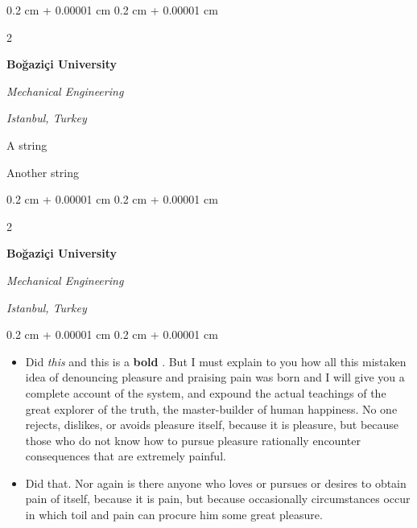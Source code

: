 \documentclass[10pt, letterpaper]{article}
\newenvironment{summary}{
    \begin{description}[
        topsep=0.10 cm,
        parsep=0.10 cm,
        partopsep=0pt,
        itemsep=0pt,
        leftmargin=0.4 cm + 10pt
    ]
}{
    \end{description}
} %
\newenvironment{highlights}{
    \begin{itemize}[
        topsep=0.10 cm,
        parsep=0.10 cm,
        partopsep=0pt,
        itemsep=0pt,
        leftmargin=0.4 cm + 10pt
    ]
}{
    \end{itemize}
} %
\newenvironment{onecolentry}{
    \begin{adjustwidth}{
        0.2 cm + 0.00001 cm
    }{
        0.2 cm + 0.00001 cm
    }
}{
    \end{adjustwidth}
} %
\newenvironment{twocolentry}[2][]{
    \onecolentry
    \def\secondColumn{#2}
    \setcolumnwidth{\fill, 4.5 cm}
    \begin{paracol}{2}
}{
    \switchcolumn \raggedleft \secondColumn
    \end{paracol}
    \endonecolentry
} %
\let\hrefWithoutArrow\href
\renewcommand{\href}[2]{\hrefWithoutArrow{#1}{\ifthenelse{\equal{#2}{}}{ }{#2 }\raisebox{.15ex}{\footnotesize \faExternalLink*}}}
\begin{document}
        \vspace{0.2 cm}

        \begin{twocolentry}{
        \textit{Istanbul, Turkey}    
            
        }
            \textbf{Boğaziçi University}

            \textit{Mechanical Engineering}
        \end{twocolentry}
            \begin{summary}
                \item A string
                \item Another string
            \end{summary}


        \vspace{0.2 cm}

        \begin{twocolentry}{
        \textit{Istanbul, Turkey}    
            
        }
            \textbf{Boğaziçi University}

            \textit{Mechanical Engineering}
        \end{twocolentry}
        \vspace{0.10 cm}
        \begin{onecolentry}
            \begin{highlights}
                \item Did \textit{this} and this is a \textbf{bold} \href{https://example.com}{link}. But I must explain to you how all this mistaken idea of denouncing pleasure and praising pain was born and I will give you a complete account of the system, and expound the actual teachings of the great explorer of the truth, the master-builder of human happiness. No one rejects, dislikes, or avoids pleasure itself, because it is pleasure, but because those who do not know how to pursue pleasure rationally encounter consequences that are extremely painful.
                \item Did that. Nor again is there anyone who loves or pursues or desires to obtain pain of itself, because it is pain, but because occasionally circumstances occur in which toil and pain can procure him some great pleasure.
            \end{highlights}
        \end{onecolentry}


        \vspace{0.2 cm}
\end{document}
